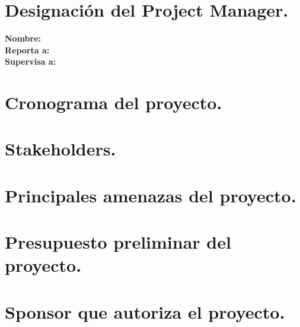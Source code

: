 \chapter*{Designaci\'on del Project Manager.}
%
\noindent \textbf{Nombre:}\\
\textbf{Reporta a:}\\
\textbf{Supervisa a:}
%

\chapter*{Cronograma del proyecto.}
%
\chapter*{Stakeholders.}
%
\chapter*{Principales amenazas del proyecto.}
%
\chapter*{Presupuesto preliminar del proyecto.}
%
\chapter*{Sponsor que autoriza el proyecto.}